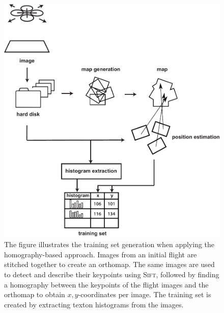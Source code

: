 \documentclass[11pt]{report}
\begin{document}
\begin{figure}[h!]
\begin{center}
\includegraphics[width=0.7\columnwidth]{overview_sift}
\caption{{\label{fig:overview_sift} The figure illustrates the
    training set generation when applying the homography-based
    approach. Images from an initial flight are stitched together to
    create an orthomap. The same images are used to detect and
    describe their keypoints using \textsc{Sift}, followed by finding
    a homography between the keypoints of the flight images and the
    orthomap to obtain $x, y$-coordinates per image. The training set
    is created by extracting texton histograms from the images.
  }}
\end{center}
\end{figure}
\end{document}
